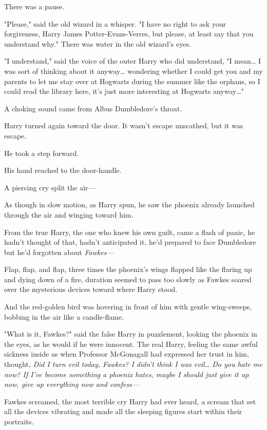 There was a pause.

"Please," said the old wizard in a whisper. "I have no right to ask your 
forgiveness, Harry James Potter-Evans-Verres, but please, at least say that you 
understand why." There was water in the old wizard's eyes.

"I understand," said the voice of the outer Harry who did understand, "I 
mean{\ldots} I was sort of thinking about it anyway{\ldots} wondering whether I 
could get you and my parents to let me stay over at Hogwarts during the summer 
like the orphans, so I could read the library here, it's just more interesting 
at Hogwarts anyway{\ldots}"

A choking sound came from Albus Dumbledore's throat.

Harry turned again toward the door. It wasn't escape unscathed, but it was 
escape.

He took a step forward.

His hand reached to the door-handle.

A piercing cry split the air---

As though in slow motion, as Harry spun, he saw the phoenix already launched 
through the air and winging toward him.

From the true Harry, the one who knew his own guilt, came a flash of panic, he 
hadn't thought of that, hadn't anticipated it, he'd prepared to face Dumbledore 
but he'd forgotten about \emph{Fawkes---}

Flap, flap, and flap, three times the phoenix's wings flapped like the flaring 
up and dying down of a fire, duration seemed to pass too slowly as Fawkes 
soared over the mysterious devices toward where Harry stood.

And the red-golden bird was hovering in front of him with gentle wing-sweeps, 
bobbing in the air like a candle-flame.

"What is it, Fawkes?" said the false Harry in puzzlement, looking the phoenix 
in the eyes, as he would if he were innocent. The real Harry, feeling the same 
awful sickness inside as when Professor McGonagall had expressed her trust in 
him, thought, \emph{Did I turn evil today, Fawkes? I didn't think I was 
evil{\ldots} Do you hate me now? If I've become something a phoenix hates, 
maybe I should just give it up now, give up everything now and confess---}

Fawkes screamed, the most terrible cry Harry had ever heard, a scream that set 
all the devices vibrating and made all the sleeping figures start within their 
portraits.


